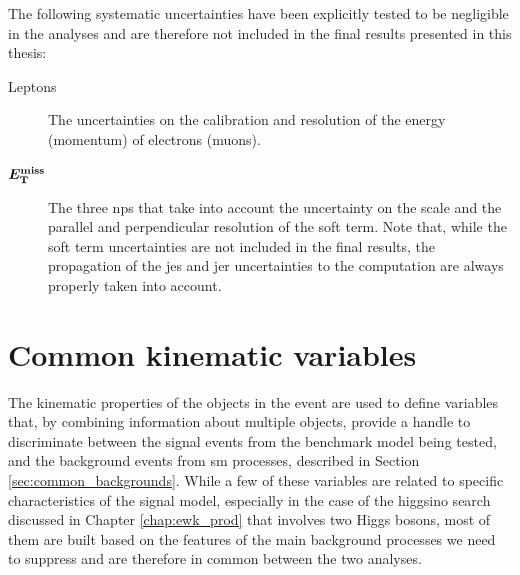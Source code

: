 \noindent The following systematic uncertainties have been explicitly tested to be negligible in the analyses and are therefore not included in the final results presented in this thesis:

\begin{description}
\item[Leptons] The uncertainties on the calibration and resolution of the energy (momentum) of electrons (muons).

\item[$\boldsymbol{E_{\rm T}^{\mathrm{miss}}}$] The three \glspl{np} that take into
account the uncertainty on the scale and the parallel and perpendicular resolution of the \met soft term. 
Note that, while the \met soft term uncertainties are not included in the final results, 
the propagation of the \gls{jes} and \gls{jer} uncertainties to the \met computation 
are always properly taken into account.

\end{description}


\section{Common kinematic variables}
\label{sec:common_variables}

The kinematic properties of the objects in the event are used to define variables that, by combining information about multiple objects, 
provide a handle to discriminate between the signal events from the benchmark model being tested, and the background events from \gls{sm} processes, described in Section \ref{sec:common_backgrounds}. 
While a few of these variables are related to specific characteristics of the signal model, especially in the case of the higgsino search 
discussed in Chapter \ref{chap:ewk_prod} that involves two Higgs bosons, most of them are built based on the features of the main  
background processes we need to suppress and are therefore in common between the two analyses. 

